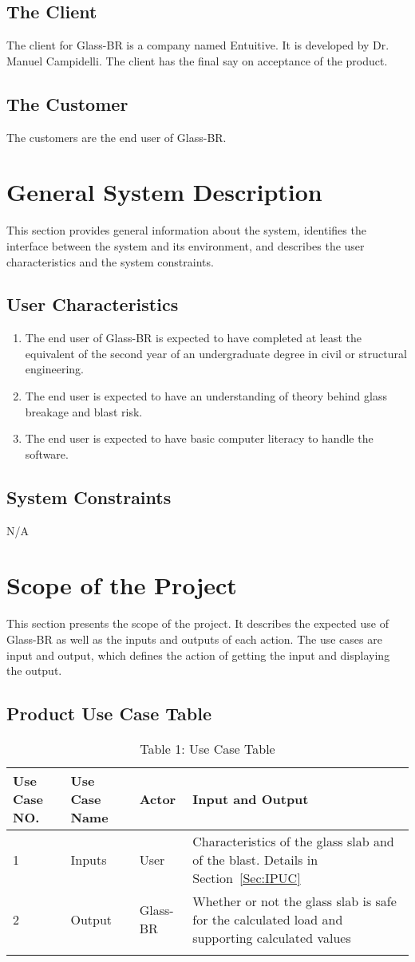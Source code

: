 \documentclass[12pt]{article}
\begin{document}
\subsection{The Client}
\label{Sec:TC}
The client for Glass-BR is a company named Entuitive. It is developed by Dr. Manuel Campidelli. The client has the final say on acceptance of the product.
\subsection{The Customer}
\label{Sec:TC}
The customers are the end user of Glass-BR.
\section{General System Description}
\label{Sec:GSD}
This section provides general information about the system, identifies the interface between the system and its environment, and describes the user characteristics and the system constraints.
\subsection{User Characteristics}
\label{Sec:UC}
\begin{enumerate}
\item{The end user of Glass-BR is expected to have completed at least the equivalent of the second year of an undergraduate degree in civil or structural engineering.}
\item{The end user is expected to have an understanding of theory behind glass breakage and blast risk.}
\item{The end user is expected to have basic computer literacy to handle the software.}
\end{enumerate}
\subsection{System Constraints}
\label{Sec:SC}
N/A
\section{Scope of the Project}
\label{Sec:SotP}
This section presents the scope of the project. It describes the expected use of Glass-BR as well as the inputs and outputs of each action. The use cases are input and output, which defines the action of getting the input and displaying the output.
\subsection{Product Use Case Table}
\label{Sec:PUCT}
\begin{longtable}{l l l l}
\toprule
Use Case NO. & Use Case Name & Actor & Input and Output
\\
\midrule
1 & Inputs & User & Characteristics of the glass slab and of the blast. Details in Section~\ref{Sec:IPUC}
\\
2 & Output & Glass-BR & Whether or not the glass slab is safe for the calculated load and supporting calculated values
\\
\bottomrule
\caption{Table 1: Use Case Table}
\label{Table:T1UCT}
\end{longtable}
\end{document}

